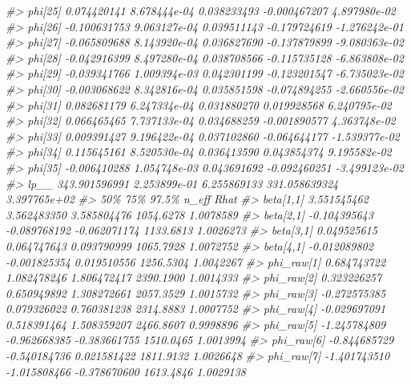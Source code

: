 \documentclass[
]{article}
\newenvironment{Shaded}{\begin{snugshade}}{\end{snugshade}}
\newcommand{\CommentTok}[1]{\textcolor[rgb]{0.56,0.35,0.01}{\textit{#1}}}
\begin{document}
\begin{Shaded}
\begin{Highlighting}[]
\CommentTok{\#\textgreater{} phi[25]       0.074420141 8.678444e{-}04 0.038233493  {-}0.000467207  4.897980e{-}02}
\CommentTok{\#\textgreater{} phi[26]      {-}0.100631753 9.063127e{-}04 0.039511143  {-}0.179724619 {-}1.276242e{-}01}
\CommentTok{\#\textgreater{} phi[27]      {-}0.065809688 8.143920e{-}04 0.036827690  {-}0.137879899 {-}9.080363e{-}02}
\CommentTok{\#\textgreater{} phi[28]      {-}0.042916399 8.497280e{-}04 0.038708566  {-}0.115735128 {-}6.863808e{-}02}
\CommentTok{\#\textgreater{} phi[29]      {-}0.039341766 1.009394e{-}03 0.042301199  {-}0.123201547 {-}6.735023e{-}02}
\CommentTok{\#\textgreater{} phi[30]      {-}0.003068622 8.342816e{-}04 0.035851598  {-}0.074894255 {-}2.660556e{-}02}
\CommentTok{\#\textgreater{} phi[31]       0.082681179 6.247334e{-}04 0.031880270   0.019928568  6.240795e{-}02}
\CommentTok{\#\textgreater{} phi[32]       0.066465465 7.737133e{-}04 0.034688259  {-}0.001890577  4.363748e{-}02}
\CommentTok{\#\textgreater{} phi[33]       0.009391427 9.196422e{-}04 0.037102860  {-}0.064644177 {-}1.539377e{-}02}
\CommentTok{\#\textgreater{} phi[34]       0.115645161 8.520530e{-}04 0.036413590   0.043854374  9.195582e{-}02}
\CommentTok{\#\textgreater{} phi[35]      {-}0.006410288 1.054748e{-}03 0.043691692  {-}0.092460251 {-}3.499123e{-}02}
\CommentTok{\#\textgreater{} lp\_\_        343.901596991 2.253899e{-}01 6.255869133 331.058639324  3.397765e+02}
\CommentTok{\#\textgreater{}                       50\%           75\%         97.5\%     n\_eff      Rhat}
\CommentTok{\#\textgreater{} beta[1,1]     3.551545462   3.562483350   3.585804476 1054.6278 1.0078589}
\CommentTok{\#\textgreater{} beta[2,1]    {-}0.104395643  {-}0.089768192  {-}0.062071174 1133.6813 1.0026273}
\CommentTok{\#\textgreater{} beta[3,1]     0.049525615   0.064747643   0.093790999 1065.7928 1.0072752}
\CommentTok{\#\textgreater{} beta[4,1]    {-}0.012089802  {-}0.001825354   0.019510556 1256.5304 1.0042267}
\CommentTok{\#\textgreater{} phi\_raw[1]    0.684743722   1.082478246   1.806472417 2390.1900 1.0014333}
\CommentTok{\#\textgreater{} phi\_raw[2]    0.323226257   0.650949892   1.308272661 2057.3529 1.0015732}
\CommentTok{\#\textgreater{} phi\_raw[3]   {-}0.272575385   0.079326022   0.760381238 2314.8883 1.0007752}
\CommentTok{\#\textgreater{} phi\_raw[4]   {-}0.029697091   0.518391464   1.508359207 2466.8607 0.9998896}
\CommentTok{\#\textgreater{} phi\_raw[5]   {-}1.245784809  {-}0.962668385  {-}0.383661755 1510.0465 1.0013994}
\CommentTok{\#\textgreater{} phi\_raw[6]   {-}0.844685729  {-}0.540184736   0.021581422 1811.9132 1.0026648}
\CommentTok{\#\textgreater{} phi\_raw[7]   {-}1.401743510  {-}1.015808466  {-}0.378670600 1613.4846 1.0029138}

\end{Highlighting}
\end{Shaded}
\end{document}
